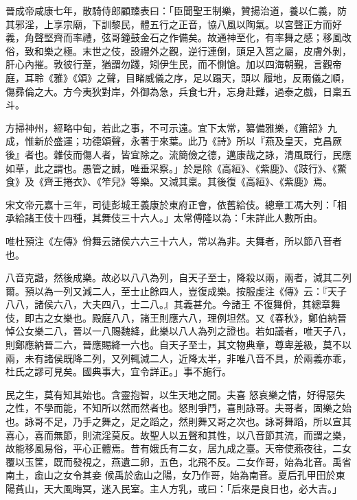 \begin{pinyinscope}
 晉成帝咸康七年，散騎侍郎顧臻表曰：「臣聞聖王制樂，贊揚治道，養以仁義，防其邪淫，上享宗廟，下訓黎民，體五行之正音，協八風以陶氣。以宮聲正方而好義，角聲堅齊而率禮，弦哥鐘鼓金石之作備矣。故通神至化，有率舞之感；移風改俗，致和樂之極。末世之伎，設禮外之觀，逆行連倒，頭足入筥之屬，皮膚外剝，肝心內摧。敦彼行葦，猶謂勿踐，矧伊生民，而不惻愴。加以四海朝覲，言觀帝庭，耳聆《雅》《頌》之聲，目睹威儀之序，足以蹋天，頭以
 履地，反兩儀之順，傷彞倫之大。方今夷狄對岸，外御為急，兵食七升，忘身赴難，過泰之戲，日稟五斗。



 方掃神州，經略中甸，若此之事，不可示遠。宜下太常，纂備雅樂，《簫韶》九成，惟新於盛運；功德頌聲，永著于來葉。此乃《詩》所以『燕及皇天，克昌厥後』者也。雜伎而傷人者，皆宜除之。流簡儉之德，邁康哉之詠，清風既行，民應如草，此之謂也。愚管之誠，唯垂采察。」於是除《高絙》、《紫鹿》、《跂行》、《鱉食》及《齊王捲衣》、《笮兒》等樂。又減其稟。其後復《高絙》、《紫鹿》焉。



 宋文帝元嘉十三年，司徒彭城王義康於東府正會，依舊給伎。總章工馮大列：「相承給諸王伎十四種，其舞伎三十六人。」太常傅隆以為：「未詳此人數所由。



 唯杜預注《左傳》佾舞云諸侯六六三十六人，常以為非。夫舞者，所以節八音者也。



 八音克諧，然後成樂。故必以八八為列，自天子至士，降殺以兩，兩者，減其二列爾。預以為一列又減二人，至士止餘四人，豈復成樂。按服虔注《傳》云：『天子八八，諸侯六八，大夫四八，士二八。』其義甚允。今諸王
 不復舞佾，其總章舞伎，即古之女樂也。殿庭八八，諸王則應六八，理例坦然。又《春秋》，鄭伯納晉悼公女樂二八，晉以一八賜魏絳，此樂以八人為列之證也。若如議者，唯天子八，則鄭應納晉二六，晉應賜絳一六也。自天子至士，其文物典章，尊卑差級，莫不以兩，未有諸侯既降二列，又列輒減二人，近降太半，非唯八音不具，於兩義亦乖，杜氏之謬可見矣。國典事大，宜令詳正。」事不施行。



 民之生，莫有知其始也。含靈抱智，以生天地之間。夫喜
 怒哀樂之情，好得惡失之性，不學而能，不知所以然而然者也。怒則爭鬥，喜則詠哥。夫哥者，固樂之始也。詠哥不足，乃手之舞之，足之蹈之，然則舞又哥之次也。詠哥舞蹈，所以宣其喜心，喜而無節，則流淫莫反。故聖人以五聲和其性，以八音節其流，而謂之樂，故能移風易俗，平心正體焉。昔有娥氏有二女，居九成之臺。天帝使燕夜往，二女覆以玉筐，既而發視之，燕遺二卵，五色，北飛不反。二女作哥，始為北音。禹省南土，嵞山之女令其妾
 候禹於嵞山之陽，女乃作哥，始為南音。夏后孔甲田於東陽萯山，天大風晦冥，迷入民室。主人方乳，或曰：「后來是良日也，必大吉。」




\end{pinyinscope}
